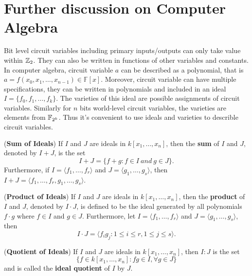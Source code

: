 \section{Further discussion on Computer Algebra}
\label{sec:moretheory}

Bit level circuit variables including primary inputs/outputs can only take value
within ${\mathbb{Z}}_2$. They can also be written in functions of other variables and constants.
In computer algebra, circuit variable $a$ can be described as a polynomial, that is
$a = f(x_0, x_1, \dots, x_{n-1}) \in {\mathbb{F}}[x]$. Moreover, circuit variable can
have multiple specifications, they can be written in polynomials and included in an
ideal $I = \{f_0, f_1, \dots, f_k\}$. The varieties of this ideal are possible 
assignments of circuit variables. Similarly for $n$ bits world-level circuit 
variables, the varieties are elements from ${\mathbb{F}}_{2^k}$. Thus it's convenient to use
ideals and varieties to describle circuit variables. \\

\begin{Definition}
({\bf Sum of Ideals}) If $I$ and $J$ are ideals in $k[x_1, \dots, x_n]$, then the 
{\bf sum} of $I$ and $J$, denoted by $I + J$, is the set
  \begin{equation}
  I + J = \{f + g : f \in I \ and\  g \in J\}.
  \end{equation}
Furthermore, if $I = \langle f_1, \dots, f_r\rangle$ and 
$J = \langle g_1, \dots, g_s\rangle$, then 
$I + J = \langle f_1, \dots, f_r, g_1, \dots, g_s\rangle$.
\end{Definition}

\begin{Definition}
({\bf Product of Ideals}) If $I$ and $J$ are ideals in $k[x_1, \dots, x_n]$, then the
{\bf product} of $I$ and $J$, denoted by $I \cdot J$, is defined to be the ideal generated 
by all polynomials $f \cdot g$ where $f \in I$ and $g \in J$. Furthermore, let
$I = \langle f_1, \dots, f_r\rangle$ and $J = \langle g_1, \dots, g_s\rangle$, then
  \begin{equation}
  I \cdot J = \langle f_ig_j : 1 \leq i \leq r, 1 \leq j \leq s\rangle .
  \end{equation}
\end{Definition}

\begin{Definition}
({\bf Quotient of Ideals}) If $I$ and $J$ are ideals in $k[x_1, \dots, x_n]$, then $I:J$
is the set
  \begin{equation}
  \{f \in k[x_1, \dots, x_n] : fg \in I, \forall g \in J\}
  \end{equation}
and is called the {\bf ideal quotient} of $I$ by $J$.
\end{Definition}

